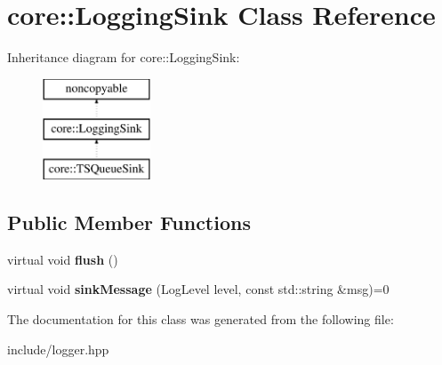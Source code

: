 \hypertarget{classcore_1_1_logging_sink}{\section{core\-:\-:Logging\-Sink Class Reference}
\label{classcore_1_1_logging_sink}
}
Inheritance diagram for core\-:\-:Logging\-Sink\-:\begin{figure}[H]
\begin{center}
\leavevmode
\includegraphics[height=3.000000cm]{classcore_1_1_logging_sink}
\end{center}
\end{figure}
\subsection*{Public Member Functions}
\begin{DoxyCompactItemize}
\item 
\hypertarget{classcore_1_1_logging_sink_adc9cb86eef4f0fc65c29acfee1e32fa4}{virtual void {\bfseries flush} ()}\label{classcore_1_1_logging_sink_adc9cb86eef4f0fc65c29acfee1e32fa4}

\item 
\hypertarget{classcore_1_1_logging_sink_a4a4336e98355da210575ba98a9df9d8e}{virtual void {\bfseries sink\-Message} (Log\-Level level, const std\-::string \&msg)=0}\label{classcore_1_1_logging_sink_a4a4336e98355da210575ba98a9df9d8e}

\end{DoxyCompactItemize}


The documentation for this class was generated from the following file\-:\begin{DoxyCompactItemize}
\item 
include/logger.\-hpp\end{DoxyCompactItemize}
